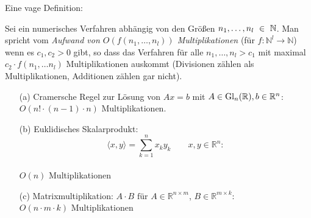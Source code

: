 Eine vage Definition:

\begin{Definition}[Aufwand]
Sei ein numerisches Verfahren abhängig von den Größen $n_1, \ldots, n_l~\in~\mathbb N$.
Man spricht vom 
\emph{Aufwand von $O(f(n_1, \dots, n_l))$ Multiplikationen}
(für $f\colon \mathbb{N}^l \to \mathbb{N}$) wenn es 
$c_1, c_2 > 0$ gibt, so dass das Verfahren für alle 
$n_1, \dots, n_l > c_1$ mit maximal $c_2 \cdot f(n_1, \dots n_l)$
Multiplikationen auskommt (Divisionen zählen als Multiplikationen, 
Additionen zählen gar nicht). 
\end{Definition}

\begin{Beispiel}[name=Zahl der Multiplikationen in verschiedenen Rechnungen,listhack]
\quad
\begin{enumerate}
\item[(a)]
Cramersche Regel zur Lösung von $Ax = b$ mit $A \in \mathrm{Gl}_n(\mathbb R), 
b \in \mathbb{R}^n$: \\
$O(n! \cdot (n-1)\cdot n)$ Multiplikationen.
\item[(b)]
Euklidisches Skalarprodukt:
$$\langle x,y \rangle = \sum_{k=1}^n x_k y_k \qquad x,y \in \mathbb{R}^n:$$ \\
$O(n)$ Multiplikationen
\item[(c)]
Matrixmultiplikation: $A \cdot B \text{ für } A\in 
\mathbb{R}^{n \times m}$, $B \in \mathbb{R}^{m \times k}$: \\
$O(n \cdot m \cdot k ) $ Multiplikationen
\end{enumerate} 
\end{Beispiel} 

